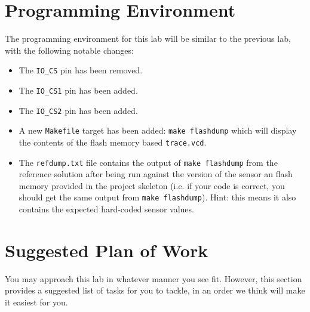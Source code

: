 \documentclass{article}
\begin{document}
\section{Programming Environment}

The programming environment for this lab will be similar to the previous lab,
with the following notable changes:

\begin{itemize}

	\item The \texttt{IO\_CS} pin has been removed.

	\item The \texttt{IO\_CS1} pin has been added.

	\item The \texttt{IO\_CS2} pin has been added.

	\item A new \texttt{Makefile} target has been added: \texttt{make
		flashdump} which will display the contents of the flash memory
		based \texttt{trace.vcd}.

	\item The \texttt{refdump.txt} file contains the output of \texttt{make
		flashdump} from the reference solution after being run against
		the version of the sensor an flash memory provided in the
		project skeleton (i.e. if your code is correct, you should get
		the same output from \texttt{make flashdump}). Hint: this means
		it also contains the expected hard-coded sensor values.

\end{itemize}

\section{Suggested Plan of Work}

You may approach this lab in whatever manner you see fit. However, this section
provides a suggested list of tasks for you to tackle, in an order we think will
make it easiest for you.
\end{document}
